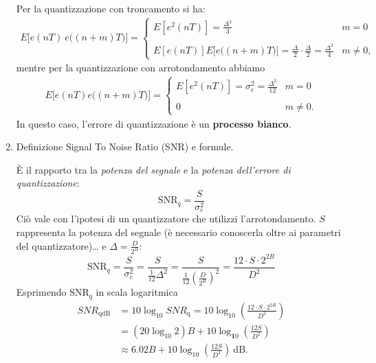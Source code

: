 \documentclass[
]{article}
\begin{document}
\begin{enumerate}
  Per la quantizzazione con troncamento si ha: \begin{align*}
  E\Big[e(nT)\ e\Big((n+m)T\Big)\Big]=\left\{\begin{array}{ll}E[e^2(nT)]=\frac{\Delta^2}{3}&m=0\\
  \\E[e(nT)]E\Big[e\Big((n+m)T\Big)\Big]=\frac{\Delta}{2}\cdot\frac{\Delta}{2} =\frac{\Delta^2}{4}&m\neq0,\end{array}\right.
  \end{align*} mentre per la quantizzazione con arrotondamento abbiamo
  \begin{align*}
  E\Big[e(nT)e\Big((n+m)T\Big)\Big]=\left\{\begin{array}{ll}E[e^2(nT)]=\sigma_e^2=\frac{\Delta^2}{12}&m=0\\\\0&m\ne0.\end{array}\right.
  \end{align*} In questo caso, l'errore di quantizzazione è un
  \textbf{processo bianco}.
\item
  Definizione Signal To Noise Ratio (SNR) e formule.

  È il rapporto tra la \emph{potenza del segnale} e la \emph{potenza
  dell'errore di quantizzazione}: \[
  \text{SNR}_q = \frac{S}{\sigma^2_e}
  \] Ciò vale con l'ipotesi di un quantizzatore che utilizzi
  l'arrotondamento. \(S\) rappresenta la potenza del segnale (è
  necessario conoscerla oltre ai parametri del quantizzatore)\ldots{} e
  \(\Delta=\frac{D}{2^{B}}\): \[
  \text{SNR}_{q}=\frac{S}{\sigma_e^2}=\frac{S}{\frac{1}{12}\Delta^2}=\frac{S}{\frac{1}{12}(\frac{D}{2^B})^2}=\frac{12\cdot S\cdot2^{2B}}{D^2}
  \] Esprimendo \(\text{SNR}_{q}\) in scala logaritmica \begin{align*}
  SNR_{\mathrm{qdB}} &=10\log_{10}SNR_{\mathrm{q}}=10\log_{10}\left(\frac{12\cdot S\cdot2^{2B}}{D^{2}}\right) \\
  &=(20 \log_{10}2)B+10\log_{\mathbf{1}0}\left(\frac{12S}{D^2}\right) \\
  &\approx6.02B+10\log_{10}\left(\frac{12S}{D^2}\right)\ \mathrm{dB}. 
  \end{align*}
\end{enumerate}
\end{document}
